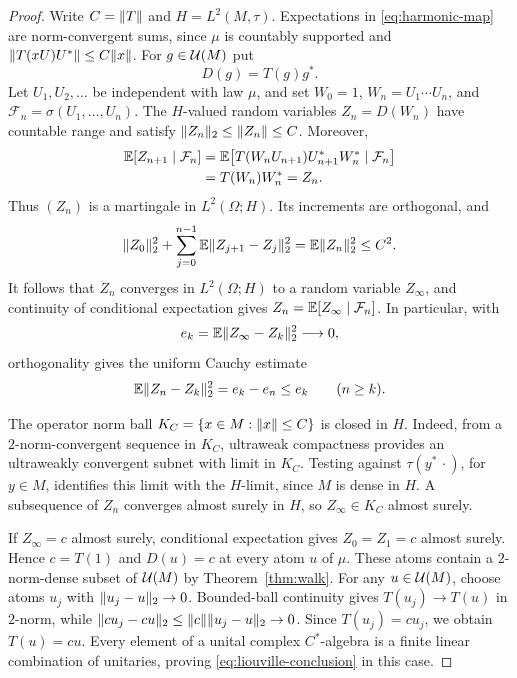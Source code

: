 \begin{proof}
Write $C=\lVert T\rVert$ and $H=L^2(M,\tau)$.  Expectations in
\eqref{eq:harmonic-map} are norm-convergent sums, since $\mu$ is
countably supported and $\lVert T(xU)U^*\rVert\le C\lVert x\rVert$.  For
$g\in\mathcal U(M)$ put
\[
 D(g)=T(g)g^*.
\]
Let $U_1,U_2,\ldots$ be independent with law $\mu$, and set
$W_0=1$, $W_n=U_1\cdots U_n$, and
$\mathcal F_n=\sigma(U_1,\ldots,U_n)$.  The $H$-valued random
variables $Z_n=D(W_n)$ have countable range and satisfy
$\lVert Z_n\rVert_2\le\lVert Z_n\rVert\le C$.  Moreover,
\begin{align*}
 \mathbb E[Z_{n+1}\mid\mathcal F_n]
 &=\mathbb E\bigl[T(W_nU_{n+1})U_{n+1}^*W_n^*
                  \mid\mathcal F_n\bigr] \\
 &=T(W_n)W_n^*=Z_n.
\end{align*}
Thus $(Z_n)$ is a martingale in $L^2(\Omega;H)$.  Its increments are
orthogonal, and
\[
 \lVert Z_0\rVert_2^2+
 \sum_{j=0}^{n-1}\mathbb E\lVert Z_{j+1}-Z_j\rVert_2^2
 =\mathbb E\lVert Z_n\rVert_2^2\le C^2.
\]
It follows that $Z_n$ converges in $L^2(\Omega;H)$ to a random variable
$Z_\infty$, and continuity of conditional expectation gives
$Z_n=\mathbb E[Z_\infty\mid\mathcal F_n]$.  In particular, with
\begin{equation}\label{eq:martingale-error}
 e_k=\mathbb E\lVert Z_\infty-Z_k\rVert_2^2\longrightarrow0,
\end{equation}
orthogonality gives the uniform Cauchy estimate
\begin{equation}\label{eq:martingale-cauchy}
 \mathbb E\lVert Z_n-Z_k\rVert_2^2=e_k-e_n\le e_k
 \qquad(n\ge k).
\end{equation}

The operator norm ball
$K_C=\{x\in M:\lVert x\rVert\le C\}$ is closed in $H$.  Indeed, from a
$2$-norm-convergent sequence in $K_C$, ultraweak compactness provides
an ultraweakly convergent subnet with limit in $K_C$.  Testing against
$\tau(y^*\,\cdot)$, for $y\in M$, identifies this limit with the
$H$-limit, since $M$ is dense in $H$.  A subsequence of $Z_n$ converges
almost surely in $H$, so $Z_\infty\in K_C$ almost surely.

If $Z_\infty=c$ almost surely, conditional expectation gives
$Z_0=Z_1=c$ almost surely.  Hence $c=T(1)$ and $D(u)=c$ at every atom
$u$ of $\mu$.  These atoms contain a $2$-norm-dense subset of
$\mathcal U(M)$ by Theorem~\ref{thm:walk}.  For any $u\in\mathcal U(M)$, choose
atoms $u_j$ with $\lVert u_j-u\rVert_2\to0$.  Bounded-ball continuity gives
$T(u_j)\to T(u)$ in $2$-norm, while
$\lVert cu_j-cu\rVert_2\le\lVert c\rVert\lVert u_j-u\rVert_2\to0$.  Since
$T(u_j)=cu_j$, we obtain $T(u)=cu$.  Every element of a unital complex
$C^*$-algebra is a finite linear combination of unitaries, proving
\eqref{eq:liouville-conclusion} in this case.


\end{proof}
